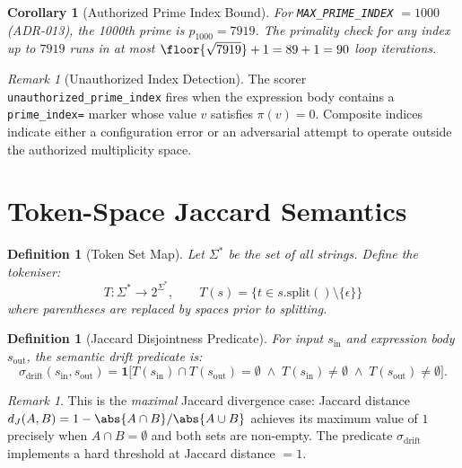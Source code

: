 \documentclass[11pt,letterpaper]{article}
\newtheorem{definition}[theorem]{Definition}
\newtheorem{corollary}[theorem]{Corollary}
\theoremstyle{remark}
\newtheorem{remark}[theorem]{Remark}
\begin{document}
\begin{corollary}[Authorized Prime Index Bound]
For \texttt{MAX\_PRIME\_INDEX} $= 1000$ (ADR-013), the 1000th prime is
$p_{1000} = 7919$.  The primality check for any index up to $7919$ runs in
at most $\floor{\sqrt{7919}} + 1 = 89 + 1 = 90$ loop iterations.
\end{corollary}

\begin{remark}[Unauthorized Index Detection]
The scorer \texttt{unauthorized\_prime\_index} fires when the expression
body contains a \texttt{prime\_index=} marker whose value $v$ satisfies
$\pi(v) = 0$.  Composite indices indicate either a configuration error or
an adversarial attempt to operate outside the authorized multiplicity space.
\end{remark}

\section{Token-Space Jaccard Semantics}
\label{sec:jaccard}

\begin{definition}[Token Set Map]
\label{def:token-map}
Let $\Sigma^*$ be the set of all strings.  Define the tokeniser:
\[
  T: \Sigma^* \to 2^{\Sigma^*}, \qquad
  T(s) = \bigl\{ t \in s.\text{split}() \setminus \{\epsilon\} \bigr\} \tag{A15}
\]
where parentheses are replaced by spaces prior to splitting.
\end{definition}

\begin{definition}[Jaccard Disjointness Predicate]
\label{def:jaccard-disjoint}
For input $s_{\text{in}}$ and expression body $s_{\text{out}}$, the
\emph{semantic drift predicate} is:
\[
  \sigma_{\text{drift}}(s_{\text{in}}, s_{\text{out}})
  = \mathbf{1}\bigl[T(s_{\text{in}}) \cap T(s_{\text{out}}) = \emptyset
    \;\wedge\; T(s_{\text{in}}) \neq \emptyset
    \;\wedge\; T(s_{\text{out}}) \neq \emptyset\bigr]. \tag{A16}
\]
\end{definition}

\begin{remark}
This is the \emph{maximal} Jaccard divergence case: Jaccard distance
$d_J(A,B) = 1 - \abs{A \cap B}/\abs{A \cup B}$ achieves its maximum
value of $1$ precisely when $A \cap B = \emptyset$ and both sets are
non-empty.  The predicate $\sigma_{\text{drift}}$ implements a hard
threshold at Jaccard distance $= 1$.
\end{remark}
\end{document}
